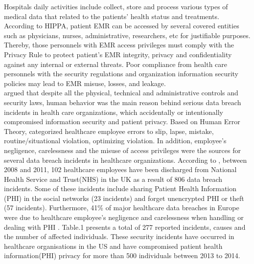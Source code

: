 Hospitals daily activities include collect, store and process various types of medical data that related to the patients' health status and treatments. According to HIPPA, patient EMR can be accessed by several covered entities such as physicians, nurses, administrative, researchers, etc for justifiable purposes. Thereby, those personnels with EMR access privileges must comply with the Privacy Rule to protect patient's EMR integrity, privacy and confidentiality against any internal or external threats. Poor compliance from health care personnels with the security regulations and organization information security policies may lead to EMR misuse, losses, and leakage.\\
\citet{Kamoun} argued that despite all the physical, technical and administrative controls and security laws, human behavior was the main reason behind serious data breach incidents in health care organizations, which accidentally or intentionally compromised information security and patient privacy. Based on Human Error Theory, \citet{Kamoun} categorized healthcare employee errors to slip, lapse, mistake, routine/situational violation, optimizing violation. In addition, employee’s negligence, carelessness and the misuse of access privileges were the sources for several data breach incidents in healthcare organizations. According to  \cite{Kamoun}, between 2008 and 2011, 102 healthcare employees have been discharged from National Health Service and Trust(NHS) in the UK as a result of 806 data breach incidents. Some of these incidents include sharing Patient Health Information (PHI) in the social networks (23 incidents) and forget unencrypted PHI or theft (57 incidents). Furthermore, 41\% of major healthcare data breaches in Europe were due to healthcare employee’s negligence and carelessness when handling or dealing with PHI \cite{Kierkegaard2012,Kamoun}. Table.1 presents a total of 277 reported incidents, causes and the number of affected individuals. These security incidents have occurred in healthcare organisations in the US and have compromised patient health information(PHI) privacy for more than 500 individuals between 2013 to 2014. 
\graphicspath{ {image/} }
